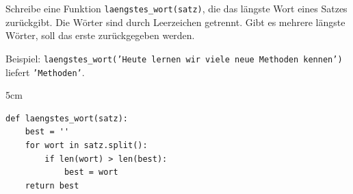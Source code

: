 \question[5]
Schreibe eine Funktion \texttt{laengstes\_wort(satz)}, die das längste Wort eines Satzes zurückgibt.
Die Wörter sind durch Leerzeichen getrennt. Gibt es mehrere längste Wörter, soll das erste zurückgegeben werden.

Beispiel: \texttt{laengstes\_wort('Heute lernen wir viele neue Methoden kennen')} liefert \texttt{'Methoden'}.

\begin{solutionbox}{5cm}
\begin{lstlisting}
def laengstes_wort(satz):
    best = ''
    for wort in satz.split():
        if len(wort) > len(best):
            best = wort
    return best
\end{lstlisting}
\end{solutionbox}
